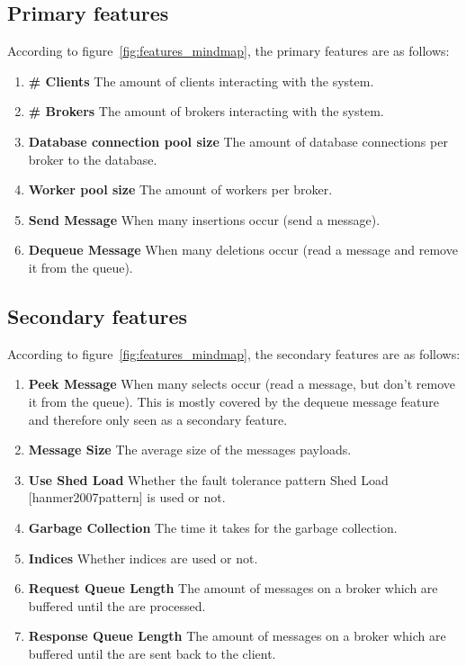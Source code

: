 \documentclass[milestone1.tex]{subfiles}
\begin{document}
\subsection{Primary features}

According to figure~\ref{fig:features_mindmap}, the primary features are as follows:

\begin{enumerate}
  \item \textbf{\# Clients} The amount of clients interacting with the system.
  \item \textbf{\# Brokers} The amount of brokers interacting with the system.
  \item \textbf{Database connection pool size} The amount of database connections per broker to the database.
  \item \textbf{Worker pool size} The amount of workers per broker.
  \item \textbf{Send Message} When many insertions occur (send a message).
  \item \textbf{Dequeue Message} When many deletions occur (read a message and remove it from the queue).
\end{enumerate}


\subsection{Secondary features}

According to figure~\ref{fig:features_mindmap}, the secondary features are as follows:

\begin{enumerate}
  \item \textbf{Peek Message} When many selects occur (read a message, but don't remove it from the queue). This is mostly covered by the dequeue message feature and therefore only seen as a secondary feature.
  \item \textbf{Message Size} The average size of the messages payloads.
  \item \textbf{Use Shed Load} Whether the fault tolerance pattern Shed Load [hanmer2007pattern] is used or not.
  \item \textbf{Garbage Collection} The time it takes for the garbage collection.
  \item \textbf{Indices} Whether indices are used or not.
  \item \textbf{Request Queue Length} The amount of messages on a broker which are buffered until the are processed.
    \item \textbf{Response Queue Length} The amount of messages on a broker which are buffered until the are sent back to the client.
\end{enumerate}
\end{document}
